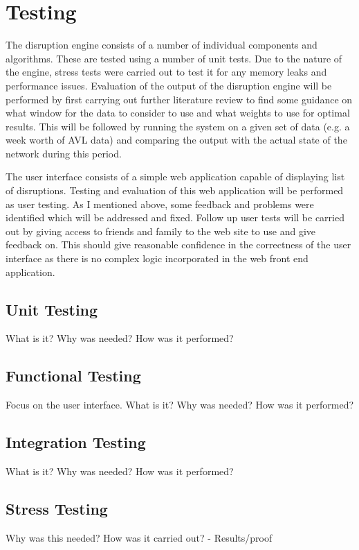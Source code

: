 \chapter{Testing}

The disruption engine consists of a number of individual components and algorithms.
These are tested using a number of unit tests. Due to the nature of
the engine, stress tests were carried out to test it for any memory leaks and
performance issues. Evaluation of the output of the disruption engine will be
performed by first carrying out further literature review to find some guidance
on what window for the data to consider to use and what weights to use for
optimal results. This will be followed by running the system on a given set
of data (e.g. a week worth of AVL data) and comparing the output with the
actual state of the network during this period.

The user interface consists of a simple web application capable of displaying
list of disruptions. Testing and evaluation of this web application will be
performed as user testing. As I mentioned above, some feedback and problems
were identified which will be addressed and fixed. Follow up user tests will be
carried out by giving access to friends and family to the web site to use and
give feedback on. This should give reasonable confidence in the correctness of
the user interface as there is no complex logic incorporated in the web front
end application.
\section{Unit Testing} 
What is it?
Why was needed?
How was it performed?

\section{Functional Testing}
Focus on the user interface.
What is it?
Why was needed?
How was it performed?

\section{Integration Testing}
What is it?
Why was needed?
How was it performed?

\section{Stress Testing}
Why was this needed?
How was it carried out? - Results/proof